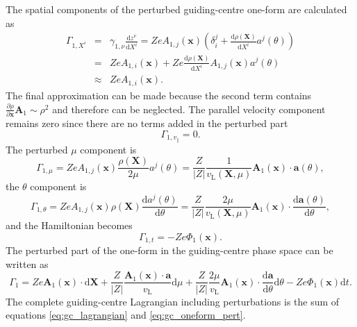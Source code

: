 \documentclass[a4paper,10pt]{article}
\newcommand{\st}[1]{\mathrm{#1}} %
\renewcommand{\vec}[1]{\mathbf{#1}}
\begin{document}
The spatial components of the perturbed guiding-centre one-form are calculated as
\begin{eqnarray*}
	\Gamma_{1,X^i} &=& \gamma_{1,\nu} \frac{\mathrm{d} z^{\nu}}{\mathrm{d} X^i}= Z e A_{1,j}(\mathbf{x}) \left( \delta^j_i + \frac{\mathrm{d} \rho(\mathbf{X})}{\mathrm{d} X^i} a^j(\theta) \right) \\ 
	&=& Z e A_{1,i}(\mathbf{x}) + Z e \frac{\mathrm{d} \rho(\mathbf{X})}{\mathrm{d} X^i} A_{1,j}(\mathbf{x}) a^j(\theta) \\
	&\approx& Z e A_{1,i}(\mathbf{x}).
\end{eqnarray*}
The final approximation can be made because the second term contains $\frac{\partial \rho}{\partial \vec{x}} \vec{A}_1 \sim \rho^2$ and therefore can be neglected. The parallel velocity component remains zero since there are no terms added in the perturbed part
\begin{equation}
	\Gamma_{1,v_{\parallel}} = 0.
\end{equation}
The perturbed $\mu$ component is
\begin{equation}
 \Gamma_{1,\mu} = Z e A_{1,j}(\mathbf{x}) \frac{\rho(\mathbf{X})}{2 \mu} a^j(\theta) = \frac{Z}{|Z|} \frac{1}{v_{\st{L}}(\mathbf{X}, \mu)} \mathbf{A}_1(\mathbf{x}) \cdot \mathbf{a}(\theta),
\end{equation}
the $\theta$ component is
\begin{equation}
	\Gamma_{1,\theta} = Z e A_{1,j}(\mathbf{x}) \rho(\mathbf{X}) \frac{\mathrm{d} a^j(\theta)}{\mathrm{d} \theta} = \frac{Z}{|Z|} \frac{2 \mu}{v_{\st{L}}(\mathbf{X},\mu)} \mathbf{A}_1(\mathbf{x}) \cdot \frac{\mathrm{d} \mathbf{a}(\theta)}{\mathrm{d} \theta},
\end{equation}
and the Hamiltonian becomes
\begin{equation}
	\Gamma_{1,t} = -Z e \Phi_1(\mathbf{x}).
\end{equation}
The perturbed part of the one-form in the guiding-centre phase space can be written as
\begin{equation}
	\Gamma_1 = Z e \mathbf{A}_1(\mathbf{x}) \cdot \mathrm{d} \mathbf{X} + \frac{Z}{|Z|} \frac{\mathbf{A}_1(\mathbf{x}) \cdot \mathbf{a}}{v_{\st{L}}} \mathrm{d} \mu + \frac{Z}{|Z|} \frac{2 \mu}{v_{\st{L}}} \mathbf{A}_1(\mathbf{x}) \cdot \frac{\mathrm{d} \mathbf{a}}{\mathrm{d} \theta} \mathrm{d} \theta - Z e \Phi_1(\mathbf{x}) \mathrm{d}t.
	\label{eq:gc_oneform_pert}
\end{equation}
The complete guiding-centre Lagrangian including perturbations is the sum of equations \ref{eq:gc_lagrangian} and \ref{eq:gc_oneform_pert}. 
\end{document}
